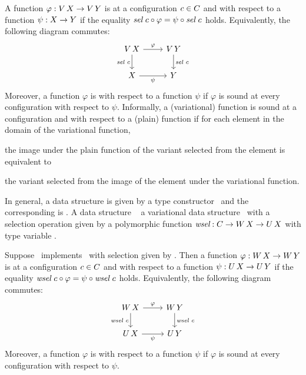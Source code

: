 A function $\varphi : \Var[\Val] \to \Var[\ValY]$ is  at a configuration $\cE \in \cS$ and with respect to a function $\psi : \Val \to \ValY$ if the equality
$
\sel\ \cE \comp \varphi = \psi \comp \sel\ \cE
$
holds.
Equivalently, the following diagram commutes:
$$
  \begin{tikzcd}
    \Var[\Val] \ar[d, "\sel\ \cE"'] \ar[r, "\varphi"] &
    \Var[\ValY] \ar[d, "\sel\ \cE"] \\
    \Val \ar[r, "\psi"'] & \ValY
  \end{tikzcd}
$$
Moreover, a function $\varphi$ is  with respect to a function $\psi$ if $\varphi$ is sound at every configuration with respect to $\psi$.
Informally, a (variational) function is sound at a configuration and with respect to a (plain) function if for each element in the domain of the variational function,
%
\begin{inparaenum}[(1)]
  \item the image under the plain function of the variant selected from the element is equivalent to
  \item the variant selected from the image of the element under the variational function.
\end{inparaenum}

In general, a data structure is given by a type constructor \TConsU\ and the corresponding  is \TConsVU.
A data structure \TConsW\  a variational data structure \TConsVU\ with a selection operation given by a polymorphic function $\wsel : \cS \to \TConsWX \to \TConsUX$ with type variable \Val.

Suppose \TConsW\ implements \TConsVU\ with selection given by \wsel.
Then a function $\varphi : \TConsWX \to \TConsWY$ is  at a configuration $\cE \in \cS$ and with respect to a function $\psi : \TConsUX \to \TConsUY$ if the equality $\wsel\ \cE \comp \varphi = \psi \comp \wsel\ \cE$ holds.
Equivalently, the following diagram commutes:
$$
  \begin{tikzcd}
    \TConsWX \ar[d, "\wsel\ \cE"'] \ar[r, "\varphi"] &
    \TConsWY \ar[d, "\wsel\ \cE"] \\
    \TConsUX \ar[r, "\psi"'] & \TConsUY
  \end{tikzcd}
$$
Moreover, a function $\varphi$ is  with respect to a function $\psi$ if $\varphi$ is sound at every configuration with respect to $\psi$.

